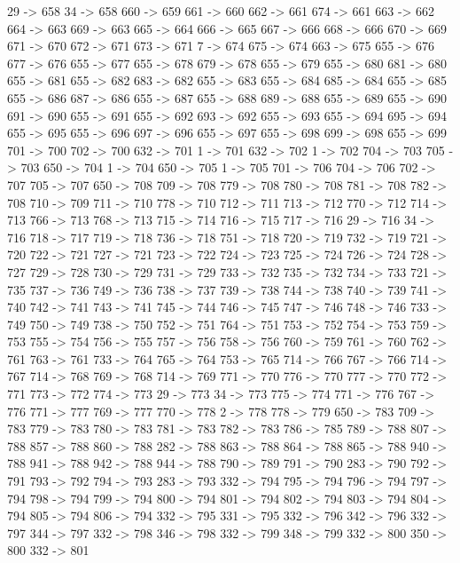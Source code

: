 {	29 -> 658
	34 -> 658
	660 -> 659
	661 -> 660
	662 -> 661
	674 -> 661
	663 -> 662
	664 -> 663
	669 -> 663
	665 -> 664
	666 -> 665
	667 -> 666
	668 -> 666
	670 -> 669
	671 -> 670
	672 -> 671
	673 -> 671
	7 -> 674
	675 -> 674
	663 -> 675
	655 -> 676
	677 -> 676
	655 -> 677
	655 -> 678
	679 -> 678
	655 -> 679
	655 -> 680
	681 -> 680
	655 -> 681
	655 -> 682
	683 -> 682
	655 -> 683
	655 -> 684
	685 -> 684
	655 -> 685
	655 -> 686
	687 -> 686
	655 -> 687
	655 -> 688
	689 -> 688
	655 -> 689
	655 -> 690
	691 -> 690
	655 -> 691
	655 -> 692
	693 -> 692
	655 -> 693
	655 -> 694
	695 -> 694
	655 -> 695
	655 -> 696
	697 -> 696
	655 -> 697
	655 -> 698
	699 -> 698
	655 -> 699
	701 -> 700
	702 -> 700
	632 -> 701
	1 -> 701
	632 -> 702
	1 -> 702
	704 -> 703
	705 -> 703
	650 -> 704
	1 -> 704
	650 -> 705
	1 -> 705
	701 -> 706
	704 -> 706
	702 -> 707
	705 -> 707
	650 -> 708
	709 -> 708
	779 -> 708
	780 -> 708
	781 -> 708
	782 -> 708
	710 -> 709
	711 -> 710
	778 -> 710
	712 -> 711
	713 -> 712
	770 -> 712
	714 -> 713
	766 -> 713
	768 -> 713
	715 -> 714
	716 -> 715
	717 -> 716
	29 -> 716
	34 -> 716
	718 -> 717
	719 -> 718
	736 -> 718
	751 -> 718
	720 -> 719
	732 -> 719
	721 -> 720
	722 -> 721
	727 -> 721
	723 -> 722
	724 -> 723
	725 -> 724
	726 -> 724
	728 -> 727
	729 -> 728
	730 -> 729
	731 -> 729
	733 -> 732
	735 -> 732
	734 -> 733
	721 -> 735
	737 -> 736
	749 -> 736
	738 -> 737
	739 -> 738
	744 -> 738
	740 -> 739
	741 -> 740
	742 -> 741
	743 -> 741
	745 -> 744
	746 -> 745
	747 -> 746
	748 -> 746
	733 -> 749
	750 -> 749
	738 -> 750
	752 -> 751
	764 -> 751
	753 -> 752
	754 -> 753
	759 -> 753
	755 -> 754
	756 -> 755
	757 -> 756
	758 -> 756
	760 -> 759
	761 -> 760
	762 -> 761
	763 -> 761
	733 -> 764
	765 -> 764
	753 -> 765
	714 -> 766
	767 -> 766
	714 -> 767
	714 -> 768
	769 -> 768
	714 -> 769
	771 -> 770
	776 -> 770
	777 -> 770
	772 -> 771
	773 -> 772
	774 -> 773
	29 -> 773
	34 -> 773
	775 -> 774
	771 -> 776
	767 -> 776
	771 -> 777
	769 -> 777
	770 -> 778
	2 -> 778
	778 -> 779
	650 -> 783
	709 -> 783
	779 -> 783
	780 -> 783
	781 -> 783
	782 -> 783
	786 -> 785
	789 -> 788
	807 -> 788
	857 -> 788
	860 -> 788
	282 -> 788
	863 -> 788
	864 -> 788
	865 -> 788
	940 -> 788
	941 -> 788
	942 -> 788
	944 -> 788
	790 -> 789
	791 -> 790
	283 -> 790
	792 -> 791
	793 -> 792
	794 -> 793
	283 -> 793
	332 -> 794
	795 -> 794
	796 -> 794
	797 -> 794
	798 -> 794
	799 -> 794
	800 -> 794
	801 -> 794
	802 -> 794
	803 -> 794
	804 -> 794
	805 -> 794
	806 -> 794
	332 -> 795
	331 -> 795
	332 -> 796
	342 -> 796
	332 -> 797
	344 -> 797
	332 -> 798
	346 -> 798
	332 -> 799
	348 -> 799
	332 -> 800
	350 -> 800
	332 -> 801
}
